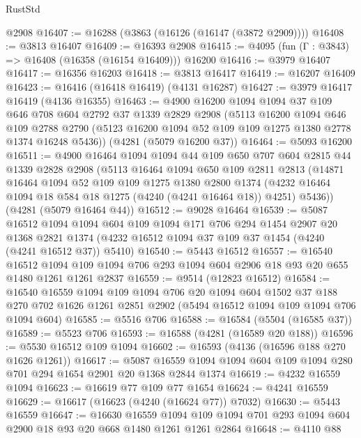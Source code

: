 \begin{lexlean}{RustStd}
\begin{coremodule}
    @2908
@16407 := @16288 (@3863 (@16126 (@16147 (@3872 @2909))))
@16408 := @3813 @16407
@16409 := @16393 @2908
@16415 := @4095 (fun (Γ : @3843) => @16408 (@16358 (@16154 @16409))) @16200
@16416 := @3979 @16407
@16417 := @16356 @16203
@16418 := @3813 @16417
@16419 := @16207 @16409
@16423 := @16416 (@16418 @16419) (@4131 @16287)
@16427 := @3979 @16417 @16419 (@4136 @16355)
@16463 := @4900
    @16200
    @1094
    @1094
    @37
    @109
    @646
    @708
    @604
    @2792
    @37
    @1339
    @2829
    @2908
    (@5113
      @16200
      @1094
      @646
      @109
      @2788
      @2790
      (@5123 @16200 @1094 @52 @109 @109 @1275 @1380 @2778 @1374 @16248 @5436))
    (@4281 (@5079 @16200 @37))
@16464 := @5093 @16200
@16511 := @4900
    @16464
    @1094
    @1094
    @44
    @109
    @650
    @707
    @604
    @2815
    @44
    @1339
    @2828
    @2908
    (@5113
      @16464
      @1094
      @650
      @109
      @2811
      @2813
      (@14871
        @16464
        @1094
        @52
        @109
        @109
        @1275
        @1380
        @2800
        @1374
        (@4232 @16464 @1094 @18 @584 @18 @1275 (@4240 (@4241 @16464 @18)) @4251)
        @5436))
    (@4281 (@5079 @16464 @44))
@16512 := @9028 @16464
@16539 := @5087
    @16512
    @1094
    @1094
    @604
    @109
    @1094
    @171
    @706
    @294
    @1454
    @2907
    @20
    @1368
    @2821
    @1374
    (@4232 @16512 @1094 @37 @109 @37 @1454 (@4240 (@4241 @16512 @37)) @5410)
@16540 := @5443 @16512
@16557 := @16540
    @16512
    @1094
    @109
    @1094
    @706
    @293
    @1094
    @604
    @2906
    @18
    @93
    @20
    @655
    @1480
    @1261
    @1261
    @2837
@16559 := @9514 (@12823 @16512)
@16584 := @16540
    @16559
    @1094
    @109
    @1094
    @706
    @20
    @1094
    @604
    @1502
    @37
    @188
    @270
    @702
    @1626
    @1261
    @2851
    @2902
    (@5494 @16512 @1094 @109 @1094 @706 @1094 @604)
@16585 := @5516 @706
@16588 := @16584 (@5504 (@16585 @37))
@16589 := @5523 @706
@16593 := @16588 (@4281 (@16589 @20 @188))
@16596 := @5530 @16512 @109 @1094
@16602 := @16593 (@4136 (@16596 @188 @270 @1626 @1261))
@16617 := @5087 @16559 @1094 @1094 @604 @109 @1094 @280 @701 @294 @1654 @2901 @20 @1368 @2844 @1374
@16619 := @4232 @16559 @1094
@16623 := @16619 @77 @109 @77 @1654
@16624 := @4241 @16559
@16629 := @16617 (@16623 (@4240 (@16624 @77)) @7032)
@16630 := @5443 @16559
@16647 := @16630
    @16559
    @1094
    @109
    @1094
    @701
    @293
    @1094
    @604
    @2900
    @18
    @93
    @20
    @668
    @1480
    @1261
    @1261
    @2864
@16648 := @4110 @88

\end{coremodule}
\end{lexlean}
